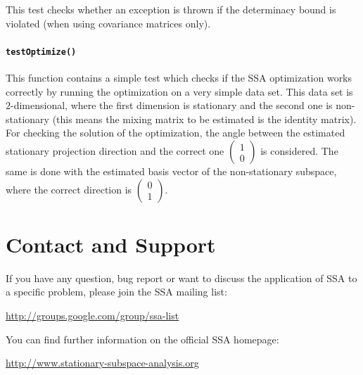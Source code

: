 \documentclass{article}
\newcommand{\1}{\ensuremath{\mathds{1}}}
\newcommand{\0}{\ensuremath{0}}
\begin{document}
This test checks whether an exception is thrown if the determinacy bound is violated (when using covariance matrices only).

\paragraph{\texttt{testOptimize()}}

This function contains a simple test which checks
if the SSA optimization works correctly by running the optimization on a very simple data set. This data set is $2$-dimensional, where
the first dimension is stationary and the second one is non-stationary (this means the mixing matrix to be estimated is the identity matrix).
For checking the solution of the optimization, the angle between the estimated stationary projection direction and the correct one
$\begin{pmatrix} 1 \\ 0\end{pmatrix}$ is considered. The same is done with the estimated basis vector of the non-stationary subspace,
where the correct direction is $\begin{pmatrix} 0 \\ 1\end{pmatrix}$.


\section{Contact and Support}

If you have any question, bug report or want to discuss the application of SSA
to a specific problem, please join the SSA mailing list:
\begin{center}
        \url{http://groups.google.com/group/ssa-list}
\end{center}
You can find further
information on the official SSA homepage: 
\begin{center}
	\url{http://www.stationary-subspace-analysis.org}
\end{center}




\end{document}
